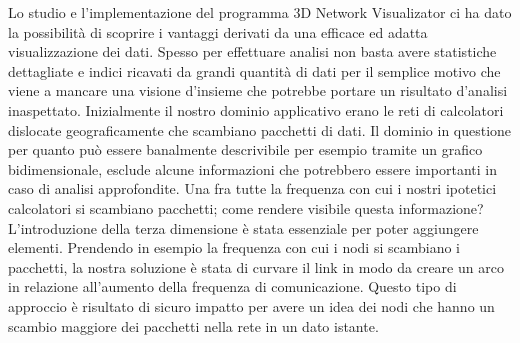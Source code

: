 \documentclass[a4paper,12pt]{article}
\begin{document}
Lo studio e l'implementazione del programma 3D Network Visualizator ci ha dato la possibilità di scoprire i vantaggi derivati da una efficace ed adatta visualizzazione dei dati. Spesso per effettuare analisi non basta avere statistiche dettagliate e indici ricavati da grandi quantità di dati per il semplice motivo che viene a mancare una visione d'insieme che potrebbe portare un risultato d'analisi inaspettato.
Inizialmente il nostro dominio applicativo erano le reti di calcolatori dislocate geograficamente che scambiano pacchetti di dati. Il dominio in questione per quanto pu\`o essere banalmente descrivibile per esempio tramite un grafico bidimensionale, esclude alcune informazioni che potrebbero essere importanti in caso di analisi approfondite. Una fra tutte la frequenza con cui i nostri ipotetici calcolatori si scambiano pacchetti; come rendere visibile questa informazione? L'introduzione della terza dimensione \`e stata essenziale per poter aggiungere elementi. 
Prendendo in esempio la frequenza con cui i nodi si scambiano i pacchetti, la nostra soluzione \`e stata di curvare il link in modo da creare un arco in relazione all'aumento della frequenza di comunicazione. Questo tipo di approccio \`e risultato di sicuro impatto per avere un idea dei nodi che hanno un scambio maggiore dei pacchetti nella rete in un dato istante. 
\end{document}
